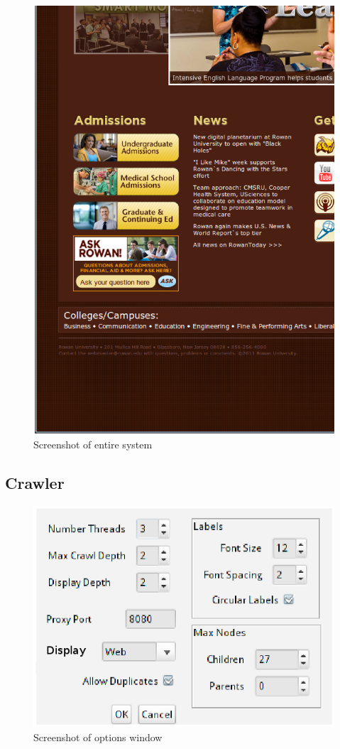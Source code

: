 \documentclass[]{article}
\begin{document}
{\begin{figure}[t]
\centering
\includegraphics[width=6.25in]{images/system}
\caption{Screenshot of entire system}
\label{fig_systemshot2}
\end{figure}
\subsection{Crawler}
\label{sss:crawler}

\begin{figure}[t]
\centering
\includegraphics[width=6.25in]{images/options_window}
\caption{Screenshot of options window}
\label{fig_paramOpts}
\end{figure}
}
\end{document}
